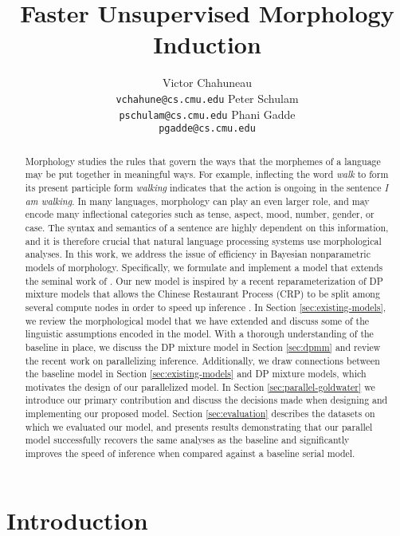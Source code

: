 \documentclass{article}
\title{Faster Unsupervised Morphology Induction}
\author{
Victor Chahuneau\\
\texttt{vchahune@cs.cmu.edu}
\And
Peter Schulam\\
\texttt{pschulam@cs.cmu.edu}
\And
Phani Gadde\\
\texttt{pgadde@cs.cmu.edu} \\
}
\begin{document}
\maketitle

\begin{abstract}
  Morphology studies the rules that govern the ways that the morphemes
  of a language may be put together in meaningful ways. For example,
  inflecting the word \textit{walk} to form its present participle
  form \textit{walking} indicates that the action is ongoing in the
  sentence \textit{I am walking}. In many languages, morphology can
  play an even larger role, and may encode many inflectional
  categories such as tense, aspect, mood, number, gender, or case. The
  syntax and semantics of a sentence are highly dependent on this
  information, and it is therefore crucial that natural language
  processing systems use morphological analyses.  In this work, we
  address the issue of efficiency in Bayesian nonparametric models of
  morphology. Specifically, we formulate and implement a model that
  extends the seminal work of \cite{goldwater2011}. Our new model is
  inspired by a recent reparameterization of DP mixture models that
  allows the Chinese Restaurant Process (CRP) to be split among
  several compute nodes in order to speed up inference
  \cite{williamson2013}. In Section \ref{sec:existing-models}, we
  review the morphological model that we have extended and discuss
  some of the linguistic assumptions encoded in the model. With a
  thorough understanding of the baseline in place, we discuss the DP
  mixture model in Section \ref{sec:dpmm} and review the recent work
  on parallelizing inference. Additionally, we draw connections
  between the baseline model in Section \ref{sec:existing-models} and
  DP mixture models, which motivates the design of our parallelized
  model. In Section \ref{sec:parallel-goldwater} we introduce our
  primary contribution and discuss the decisions made when designing
  and implementing our proposed model. Section \ref{sec:evaluation}
  describes the datasets on which we evaluated our model, and presents
  results demonstrating that our parallel model successfully recovers
  the same analyses as the baseline and significantly improves the
  speed of inference when compared against a baseline serial model.
\end{abstract}

\section{Introduction}
\label{sec:introduction}
\end{document}
